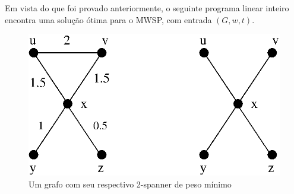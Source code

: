  
  Em vista do que foi provado anteriormente, o seguinte programa
  linear inteiro encontra uma solução ótima para o MWSP, com entrada $(G,w,t)$.


\begin{lpformulation}[(P)]
\end{lpformulation}

\begin{figure}[t] 
\centering
\includegraphics[scale=0.45]{figuras/exemplo_Y_minimal}
\caption{Um grafo com seu respectivo 2-spanner de peso mínimo}
\label{fig:exemplo_Y_minimal}
\end{figure}





